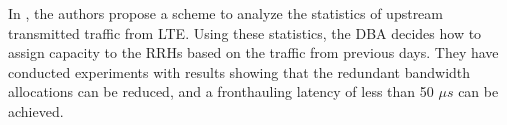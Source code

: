 In \cite{Kobayashi2016}, the authors propose a scheme to analyze the statistics of upstream transmitted traffic from \ac{LTE}. Using these statistics, the \ac{DBA} decides how to assign capacity to the \acp{RRH} based on the traffic from previous days. They have conducted experiments with results showing that the redundant bandwidth allocations can be reduced, and a fronthauling latency of less than 50 $\mu s$ can be achieved.



